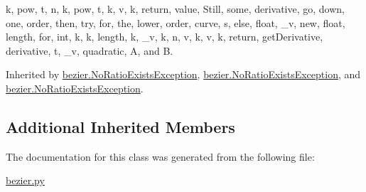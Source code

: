 k, pow, t, n, k, pow, t, k, v, k, return, value, Still, some, derivative, go, down, one, order, then, try, for, the, lower, order, curve, s, else, float, \+\_\+v, new, float, length, for, int, k, k, length, k, \+\_\+v, k, n, v, k, v, k, return, get\+Derivative, derivative, t, \+\_\+v, quadratic, A, and B.



Inherited by \hyperlink{classbezier_1_1_no_ratio_exists_exception}{bezier.\+No\+Ratio\+Exists\+Exception}, \hyperlink{classbezier_1_1_no_ratio_exists_exception}{bezier.\+No\+Ratio\+Exists\+Exception}, and \hyperlink{classbezier_1_1_no_ratio_exists_exception}{bezier.\+No\+Ratio\+Exists\+Exception}.

\subsection*{Additional Inherited Members}


The documentation for this class was generated from the following file\+:\begin{DoxyCompactItemize}
\item 
\hyperlink{bezier_8py}{bezier.\+py}\end{DoxyCompactItemize}
